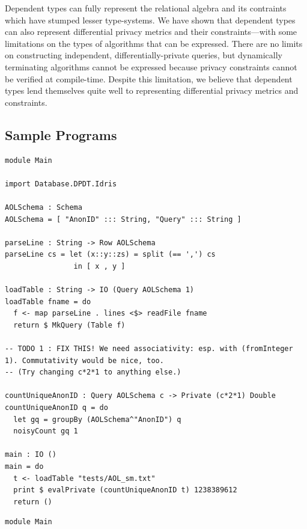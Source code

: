 \documentclass[12pt]{report}
\begin{document}
Dependent types can fully represent the relational algebra and its contraints which have stumped lesser type-systems\cite{OurySwierstra08PowerOfPi}.
We have shown that dependent types can also represent differential privacy metrics and their constraints---with some limitations on the types of algorithms that can be expressed.
There are no limits on constructing independent, differentially-private queries, but dynamically terminating algorithms cannot be expressed because privacy constraints cannot be verified at compile-time.
Despite this limitation, we believe that dependent types lend themselves quite well to representing differential privacy metrics and constraints.




\begin{appendices}

\chapter{Sample Programs}

\begin{lstlisting}[caption={tests/Idris/AOLData.idr},label={appx:aoldata_idris}]
module Main

import Database.DPDT.Idris

AOLSchema : Schema
AOLSchema = [ "AnonID" ::: String, "Query" ::: String ]

parseLine : String -> Row AOLSchema
parseLine cs = let (x::y::zs) = split (== ',') cs
                in [ x , y ]

loadTable : String -> IO (Query AOLSchema 1)
loadTable fname = do
  f <- map parseLine . lines <$> readFile fname
  return $ MkQuery (Table f)

-- TODO 1 : FIX THIS! We need associativity: esp. with (fromInteger 1). Commutativity would be nice, too.
-- (Try changing c*2*1 to anything else.)

countUniqueAnonID : Query AOLSchema c -> Private (c*2*1) Double
countUniqueAnonID q = do
  let gq = groupBy (AOLSchema^"AnonID") q
  noisyCount gq 1

main : IO ()
main = do
  t <- loadTable "tests/AOL_sm.txt"
  print $ evalPrivate (countUniqueAnonID t) 1238389612
  return ()

\end{lstlisting}

\begin{lstlisting}[caption={tests/SQLite/AOLData.idr},label={appx:aoldata_sqlite}]
module Main


\end{lstlisting}
\end{appendices}
\end{document}
